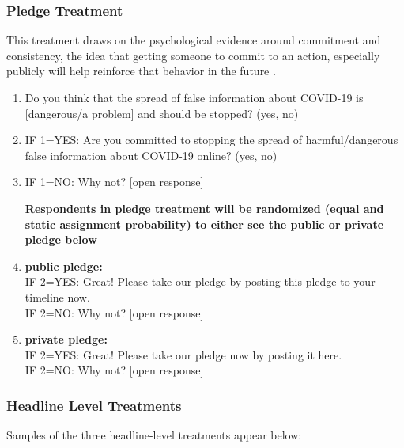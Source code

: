 \documentclass[letterpaper, 12pt, parskip=full,]{scrartcl}
\begin{document}
\FloatBarrier
\subsubsection{Pledge Treatment}
\label{sec:pledge}
This treatment draws on the psychological evidence around commitment and consistency, the idea that getting someone to commit to an action, especially publicly will help reinforce that behavior in the future \citep{cialdini1987influence,costa2018walking}.



\begin{enumerate}

\item Do you think that the spread of false information about COVID-19 is [dangerous/a problem] and should be stopped? (yes, no)

\item IF 1=YES: Are you committed to stopping the spread of harmful/dangerous false information about COVID-19 online? (yes, no)
\item IF 1=NO: Why not? [open response]


\textbf{Respondents in pledge treatment will be randomized (equal and static assignment probability) to either see the public or private pledge below}

\item \textbf{public pledge:}\\
IF 2=YES:  Great! Please take our pledge by posting this pledge to your timeline now. \\ IF 2=NO: Why not? [open response]

\item \textbf{private pledge:}\\
IF 2=YES:  Great! Please take our pledge now by posting it here. \\
IF 2=NO: Why not? [open response]

\end{enumerate}

\subsubsection{Headline Level Treatments}
Samples of the three headline-level treatments appear below:
\end{document}
